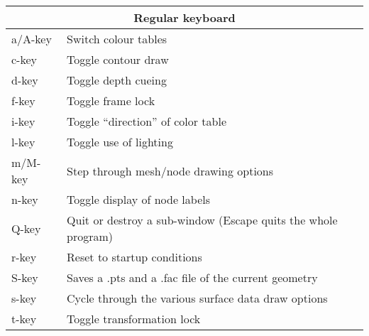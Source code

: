 \begin{table}[htbp]
\begin{center}
\begin{tabular}{|l|p{4in}|} \hline
        \multicolumn{2}{|c|}{Regular keyboard} \\ \hline
        a/A-key   &       Switch colour tables \\ \hline
        c-key   &       Toggle contour draw \\ \hline
        d-key   &       Toggle depth cueing\\ \hline
	f-key   &	Toggle frame lock \\ \hline
	i-key	& 	Toggle ``direction'' of color table\\ \hline
        l-key   &       Toggle use of lighting\\ \hline
        m/M-key   &       Step through mesh/node drawing options \\ \hline
	n-key   &       Toggle display of node labels \\ \hline
         Q-key   &       Quit or destroy a sub-window (Escape quits the
                         whole program) \\ \hline
        r-key   &       Reset to startup conditions \\ \hline
	S-key   &       Saves a .pts and a .fac file of the current 
	geometry \\ \hline
        s-key   &      Cycle through the various surface data draw 
        options \\ \hline
	t-key   &	Toggle transformation lock \\ \hline

\end{tabular}
\end{center}
\end{table}
